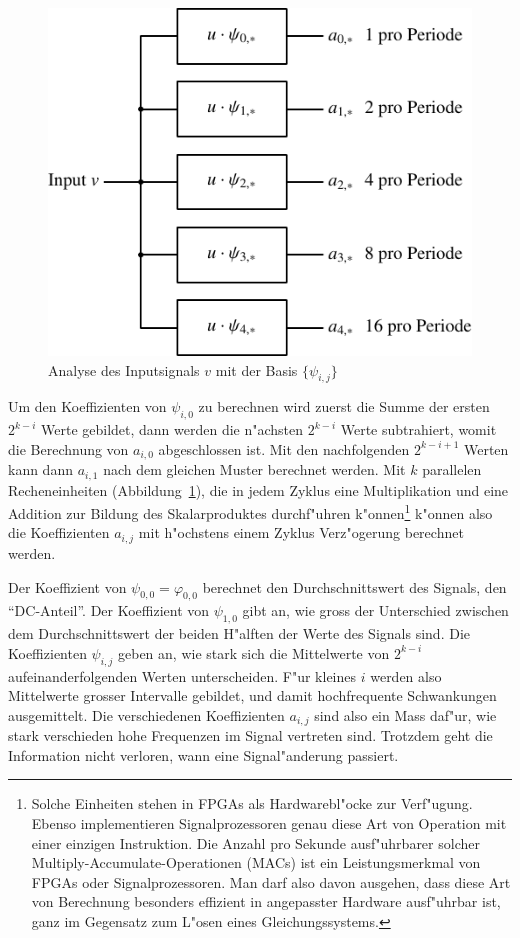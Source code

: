 \begin{figure}
\begin{center}
\includegraphics[width=0.65\hsize]{images/signal-2}
\end{center}
\caption{Analyse des Inputsignals $v$ mit der Basis $\{\psi_{i,j}\}$
\label{waveletanalysis}}
\end{figure}
Um den Koeffizienten von $\psi_{i,0}$ zu berechnen wird zuerst
die Summe der ersten $2^{k-i}$ Werte gebildet, dann werden die
n"achsten $2^{k-i}$ Werte subtrahiert, womit die Berechnung von $a_{i,0}$
abgeschlossen ist. Mit den nachfolgenden $2^{k-i+1}$ Werten kann dann
$a_{i,1}$ nach dem gleichen Muster berechnet werden. Mit $k$ parallelen
Recheneinheiten (Abbildung~\ref{waveletanalysis}),
die in jedem Zyklus eine Multiplikation und eine Addition zur
Bildung des Skalarproduktes durchf"uhren k"onnen\footnote{Solche 
Einheiten stehen in FPGAs als Hardwarebl"ocke zur Verf"ugung. Ebenso
implementieren Signalprozessoren genau diese Art von Operation
mit einer einzigen Instruktion.
Die Anzahl pro Sekunde ausf"uhrbarer solcher
Multiply-Accumulate-Operationen (MACs)
ist ein Leistungsmerkmal von FPGAs oder Signalprozessoren.
Man darf also davon ausgehen,
dass diese Art von Berechnung besonders effizient in angepasster
Hardware ausf"uhrbar ist, ganz im Gegensatz zum L"osen eines
Gleichungssystems.}
k"onnen also die Koeffizienten $a_{i,j}$ mit h"ochstens
einem Zyklus Verz"ogerung berechnet werden.

Der Koeffizient von $\psi_{0,0}=\varphi_{0,0}$ berechnet
den Durchschnittswert des Signals, den ``DC-Anteil''.
Der Koeffizient von $\psi_{1,0}$ gibt an, wie gross der Unterschied 
zwischen dem Durchschnittswert der beiden H"alften der Werte
des Signals sind.
Die Koeffizienten $\psi_{i,j}$ geben an, wie stark sich die Mittelwerte
von $2^{k-i}$ aufeinanderfolgenden Werten unterscheiden.
F"ur kleines $i$ werden also Mittelwerte grosser Intervalle
gebildet, und damit hochfrequente Schwankungen ausgemittelt.
Die verschiedenen Koeffizienten $a_{i,j}$ sind also ein Mass
daf"ur, wie stark verschieden hohe Frequenzen im Signal
vertreten sind. Trotzdem geht die Information nicht verloren,
wann eine Signal"anderung passiert.

